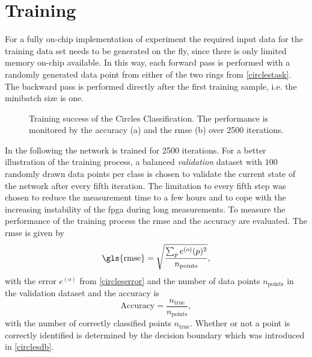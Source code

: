 \section{Training}
For a fully on-chip implementation of experiment the required input data for the training data set needs to be generated on the fly, since there is only limited memory on-chip available. In this way, each forward pass is performed with a randomly generated data point from either of the two rings from \cref{circlestask}. The backward pass is performed directly after the first training sample, i.e. the minibatch size is one.

\begin{figure}
	\begin{center}
		
	\end{center}
	\caption[Training success of the Circles Classification.]{Training success of the Circles Classification. The performance is monitored by the accuracy (a) and the \acrfull{rmse} (b) over 2500 iterations.}
	\label{circles_acc}
\end{figure}

In the following the network is trained for 2500 iterations. For a better illustration of the training process, a balanced \emph{validation} dataset with $100$ randomly drawn data points per class is chosen to validate the current state of the network after every fifth iteration. The limitation to every fifth step was chosen to reduce the measurement time to a few hours and to cope with the increasing instability of the \gls{fpga} during long measurements. To measure the performance of the training process the \gls{rmse} and the accuracy are evaluated. The \gls{rmse} is given by
\begin{equation}
\text{\gls{rmse}} = \sqrt{\frac{\sum_p e^{(o)}(p)^2}{n_\text{points}}},
\end{equation}
with the error $e^{(o)}$ from \cref{circleserror} and the number of data points $n_\text{points}$ in the validation dataset and the accuracy is
\begin{equation}
\text{Accuracy} = \frac{n_\text{true}}{n_\text{points}},
\end{equation}
with the number of correctly classified points $n_\text{true}$. Whether or not a point is correctly identified is determined by the decision boundary which was introduced in \cref{circlesdb}.

%	

